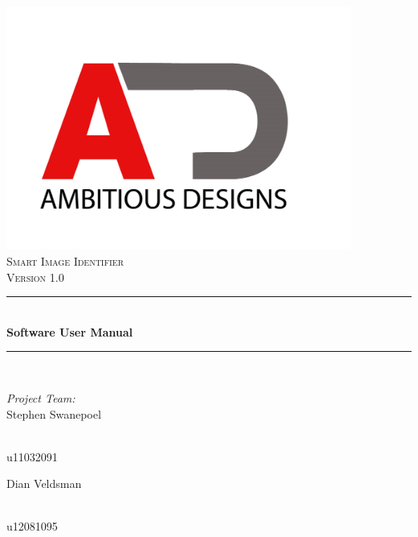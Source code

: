 \documentclass[a4paper,12pt]{report}
\newcommand{\HRule}{\rule{\linewidth}{0.5mm}}
\begin{document}
\begin{titlepage}
\begin{center}
\includegraphics[height=8cm]{../Images/ad.jpg}\\
\textsc{\Large Smart Image Identifier }\\[1.0cm]
\textsc{\Large Version 1.0 }\\[0.5cm]
\HRule \\[0.4cm]
{ \huge \bfseries  Software User Manual}\\[0.4cm]
\HRule \\[0.4cm]
\begin{minipage}{0.4\textwidth}
\begin{flushleft} \large
\emph{Project Team:}\\
Stephen {Swanepoel}
\end{flushleft}
\end{minipage}
\begin{minipage}{0.4\textwidth}
\begin{flushright} \large
\emph{} \\
u11032091
\end{flushright}
\end{minipage}
\begin{minipage}{0.4\textwidth}
\begin{flushleft} \large
Dian {Veldsman}
\end{flushleft}
\end{minipage}
\begin{minipage}{0.4\textwidth}
\begin{flushright} \large
\emph{} \\
u12081095
\end{flushright}
\end{minipage}

\end{center}
\end{titlepage}
\footnotesize
\normalsize
\end{document}
